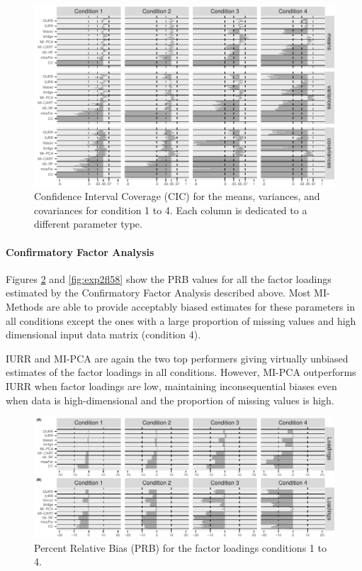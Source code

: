 \begin{figure}
	\includegraphics{../../output/graphs/exp2_semR_ci_14.pdf}
\caption{Confidence Interval Coverage (CIC) for the means, variances, and covariances for condition 1 to 4.
	Each column is dedicated to a different parameter type.}
\label{fig:exp2cir}
\end{figure}

\FloatBarrier %

\paragraph{Confirmatory Factor Analysis}

	Figures \ref{fig:exp2fl14} and \ref{fig:exp2fl58} show the PRB values for all the factor loadings estimated by
	the Confirmatory Factor Analysis described above. 
	Most MI-Methods are able to provide acceptably biased estimates for these parameters in 
	all conditions except the ones with a large proportion of missing values and high 
	dimensional input data matrix (condition 4).

	IURR and MI-PCA are again the two top performers giving virtually unbiased estimates
	of the factor loadings in all conditions.
	However, MI-PCA outperforms IURR when factor loadings are low, maintaining inconsequential 
	biases even when data is high-dimensional and the proportion of missing values is high.

\begin{figure}[h]
	\includegraphics{../../output/graphs/exp2_CFA_lambda_BPR.pdf}
\caption{Percent Relative Bias (PRB) for the factor loadings conditions 1 to 4.}
\label{fig:exp2fl14}
\end{figure}

\FloatBarrier %


